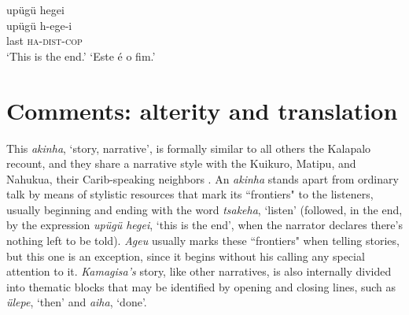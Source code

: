 \documentclass[output=paper,
modfonts,nonflat
]{langsci/langscibook}
\begin{document}
\ea  upügü hegei\\[.3em]
\gll upügü h-ege-i\\
     last \textsc{ha}-\textsc{dist}-\textsc{cop}\\
\glt ‘This is the end.’
\glt ‘Este é o fim.’
\z

\section{Comments: alterity and translation}

This \textit{akinha}, ‘story, narrative', is formally similar to all others the Kalapalo recount, and they share a narrative style with the Kuikuro, Matipu, and Nahukua, their Carib-speaking neighbors \citep{Basso1985,Franchetto1986}. An \textit{akinha} stands apart from ordinary talk by means of stylistic resources that mark its “frontiers" to the listeners, usually beginning and ending with the word \textit{tsakeha}, ‘listen' (followed, in the end, by the expression \textit{upügü hegei}, ‘this is the end', when the narrator declares there's nothing left to be told). \textit{Ageu} usually marks these “frontiers" when telling stories, but this one is an exception, since it begins without his calling any special attention to it. \textit{Kamagisa's} story, like other narratives, is also internally divided into thematic blocks that may be identified by opening and closing lines, such as \textit{ülepe}, ‘then' and \textit{aiha}, ‘done'.
    
\end{document}
